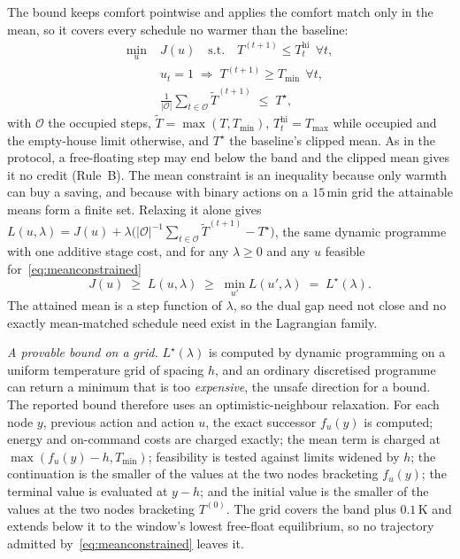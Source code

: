 \documentclass[pdflatex,sn-mathphys-num,iicol]{sn-jnl}
\theoremstyle{thmstyleone}\newtheorem{proposition}{Proposition}\newtheorem{corollary}{Corollary}
\theoremstyle{thmstyletwo}\newtheorem{remark}{Remark}\newtheorem{observation}{Observation}
\theoremstyle{thmstylethree}\newtheorem{definition}{Definition}
\newcommand{\Tmin}{T_{\min}}
\newcommand{\Tmax}{T_{\max}}
\begin{document}
The bound keeps comfort pointwise and applies the comfort match only in the mean, so it covers every schedule no warmer than the baseline:
\begin{equation}
\begin{split}
  \min_{u}\;&J(u)\quad\text{s.t.}\quad
    T^{(t+1)}\le T^{\mathrm{hi}}_t\ \ \forall t,\\
  &u_t=1\;\Rightarrow\;T^{(t+1)}\ge\Tmin\ \ \forall t,\\
  &\tfrac{1}{|\mathcal{O}|}\textstyle\sum_{t\in\mathcal{O}}\tilde T^{(t+1)}
    \;\le\;T^{\star},
\end{split}
\label{eq:meanconstrained}
\end{equation}
with $\mathcal{O}$ the occupied steps, $\tilde T=\max(T,\Tmin)$, $T^{\mathrm{hi}}_t=\Tmax$ while occupied and the empty-house limit otherwise, and $T^{\star}$ the baseline's clipped mean. As in the protocol, a free-floating step may end below the band and the clipped mean gives it no credit (Rule~B). The mean constraint is an inequality because only warmth can buy a saving, and because with binary actions on a $15\,$min grid the attainable means form a finite set. Relaxing it alone gives $L(u,\lambda)=J(u)+\lambda\bigl(|\mathcal{O}|^{-1}\sum_{t\in\mathcal{O}}\tilde T^{(t+1)}-T^{\star}\bigr)$, the same dynamic programme with one additive stage cost, and for any $\lambda\ge0$ and any $u$ feasible for~\eqref{eq:meanconstrained}
\begin{equation}
  J(u)\;\ge\;L(u,\lambda)\;\ge\;\min_{u'}L(u',\lambda)\;=\;L^{\star}(\lambda).
  \label{eq:dual_bound}
\end{equation}
The attained mean is a step function of $\lambda$, so the dual gap need not close and no exactly mean-matched schedule need exist in the Lagrangian family.

\emph{A provable bound on a grid.} $L^{\star}(\lambda)$ is computed by dynamic programming on a uniform temperature grid of spacing $h$, and an ordinary discretised programme can return a minimum that is too \emph{expensive}, the unsafe direction for a bound. The reported bound therefore uses an optimistic-neighbour relaxation. For each node $y$, previous action and action $u$, the exact successor $f_u(y)$ is computed; energy and on-command costs are charged exactly; the mean term is charged at $\max(f_u(y)-h,\Tmin)$; feasibility is tested against limits widened by $h$; the continuation is the smaller of the values at the two nodes bracketing $f_u(y)$; the terminal value is evaluated at $y-h$; and the initial value is the smaller of the values at the two nodes bracketing $T^{(0)}$. The grid covers the band plus $0.1\,$K and extends below it to the window's lowest free-float equilibrium, so no trajectory admitted by~\eqref{eq:meanconstrained} leaves it.
\end{document}

